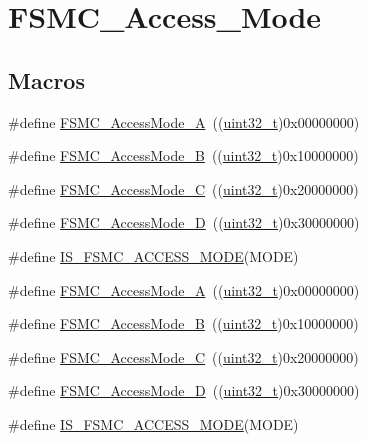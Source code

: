 \hypertarget{group___f_s_m_c___access___mode}{}\section{F\+S\+M\+C\+\_\+\+Access\+\_\+\+Mode}
\label{group___f_s_m_c___access___mode}
\subsection*{Macros}
\begin{DoxyCompactItemize}
\item 
\#define \hyperlink{group___f_s_m_c___access___mode_gae0f299b51c12257311694c4a8f5c00c3}{F\+S\+M\+C\+\_\+\+Access\+Mode\+\_\+A}~((\hyperlink{_p_e___types_8h_a33594304e786b158f3fb30289278f5af}{uint32\+\_\+t})0x00000000)
\item 
\#define \hyperlink{group___f_s_m_c___access___mode_ga2d6ce7481eb5e0e86fda727c646e4109}{F\+S\+M\+C\+\_\+\+Access\+Mode\+\_\+B}~((\hyperlink{_p_e___types_8h_a33594304e786b158f3fb30289278f5af}{uint32\+\_\+t})0x10000000)
\item 
\#define \hyperlink{group___f_s_m_c___access___mode_ga83ffa035cf2e95c957b67a2e8b879e86}{F\+S\+M\+C\+\_\+\+Access\+Mode\+\_\+C}~((\hyperlink{_p_e___types_8h_a33594304e786b158f3fb30289278f5af}{uint32\+\_\+t})0x20000000)
\item 
\#define \hyperlink{group___f_s_m_c___access___mode_ga7c632e7ebeb0c0ab4919bb60b8714c7b}{F\+S\+M\+C\+\_\+\+Access\+Mode\+\_\+D}~((\hyperlink{_p_e___types_8h_a33594304e786b158f3fb30289278f5af}{uint32\+\_\+t})0x30000000)
\item 
\#define \hyperlink{group___f_s_m_c___access___mode_ga1844335f297ea30e9d7fae09ce562092}{I\+S\+\_\+\+F\+S\+M\+C\+\_\+\+A\+C\+C\+E\+S\+S\+\_\+\+M\+O\+DE}(M\+O\+DE)
\item 
\#define \hyperlink{group___f_s_m_c___access___mode_gae0f299b51c12257311694c4a8f5c00c3}{F\+S\+M\+C\+\_\+\+Access\+Mode\+\_\+A}~((\hyperlink{_p_e___types_8h_a33594304e786b158f3fb30289278f5af}{uint32\+\_\+t})0x00000000)
\item 
\#define \hyperlink{group___f_s_m_c___access___mode_ga2d6ce7481eb5e0e86fda727c646e4109}{F\+S\+M\+C\+\_\+\+Access\+Mode\+\_\+B}~((\hyperlink{_p_e___types_8h_a33594304e786b158f3fb30289278f5af}{uint32\+\_\+t})0x10000000)
\item 
\#define \hyperlink{group___f_s_m_c___access___mode_ga83ffa035cf2e95c957b67a2e8b879e86}{F\+S\+M\+C\+\_\+\+Access\+Mode\+\_\+C}~((\hyperlink{_p_e___types_8h_a33594304e786b158f3fb30289278f5af}{uint32\+\_\+t})0x20000000)
\item 
\#define \hyperlink{group___f_s_m_c___access___mode_ga7c632e7ebeb0c0ab4919bb60b8714c7b}{F\+S\+M\+C\+\_\+\+Access\+Mode\+\_\+D}~((\hyperlink{_p_e___types_8h_a33594304e786b158f3fb30289278f5af}{uint32\+\_\+t})0x30000000)
\item 
\#define \hyperlink{group___f_s_m_c___access___mode_ga1844335f297ea30e9d7fae09ce562092}{I\+S\+\_\+\+F\+S\+M\+C\+\_\+\+A\+C\+C\+E\+S\+S\+\_\+\+M\+O\+DE}(M\+O\+DE)
\end{DoxyCompactItemize}


